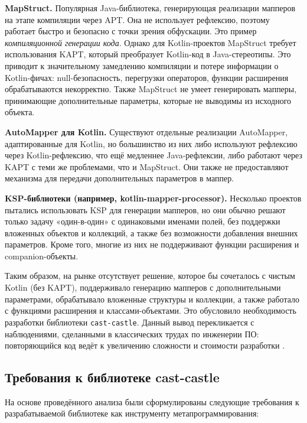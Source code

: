 \textbf{MapStruct.} Популярная Java-библиотека, генерирующая реализации мапперов на этапе компиляции через APT. Она не использует рефлексию, поэтому работает быстро и безопасно с точки зрения обфускации. Это пример \textit{компиляционной генерации кода}. Однако для Kotlin-проектов MapStruct требует использования KAPT, который преобразует Kotlin-код в Java-стереотипы. Это приводит к значительному замедлению компиляции и потере информации о Kotlin-фичах: null-безопасность, перегрузки операторов, функции расширения обрабатываются некорректно. Также MapStruct не умеет генерировать мапперы, принимающие дополнительные параметры, которые не выводимы из исходного объекта.

\textbf{AutoMapper для Kotlin.} Существуют отдельные реализации AutoMapper, адаптированные для Kotlin, но большинство из них либо используют рефлексию через Kotlin-рефлексию, что ещё медленнее Java-рефлексии, либо работают через KAPT с теми же проблемами, что и MapStruct. Они также не предоставляют механизма для передачи дополнительных параметров в маппер.

\textbf{KSP-библиотеки (например, kotlin-mapper-processor).} Несколько проектов пытались использовать KSP для генерации мапперов, но они обычно решают только задачу «один-в-один» с одинаковыми именами полей, без поддержки вложенных объектов и коллекций, а также без возможности добавления внешних параметров. Кроме того, многие из них не поддерживают функции расширения и companion-объекты.

Таким образом, на рынке отсутствует решение, которое бы сочеталось с чистым Kotlin (без KAPT), поддерживало генерацию мапперов с дополнительными параметрами, обрабатывало вложенные структуры и коллекции, а также работало с функциями расширения и классами-объектами. Это обусловило необходимость разработки библиотеки \texttt{cast-castle}. Данный вывод перекликается с наблюдениями, сделанными в классических трудах по инженерии ПО: повторяющийся код ведёт к увеличению сложности и стоимости разработки \cite{refi, refl}.

\subsection{Требования к библиотеке cast-castle}

На основе проведённого анализа были сформулированы следующие требования к разрабатываемой библиотеке как инструменту метапрограммирования:

